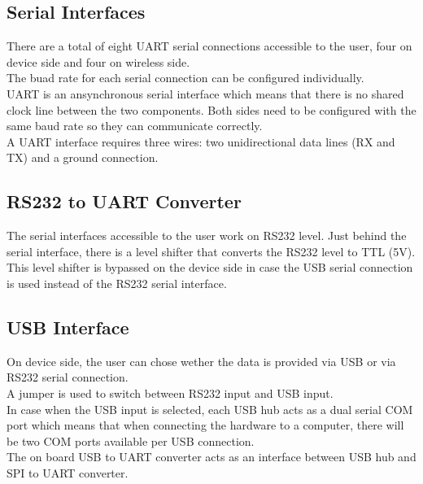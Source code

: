 \subsection{Serial Interfaces}
There are a total of eight UART serial connections accessible to the user, four on device side and four on wireless side.\\
The buad rate for each serial connection can be configured individually. \\
UART is an ansynchronous serial interface which means that there is no shared clock line between the two components. Both sides need to be configured with the same baud rate so they can communicate correctly.\\
A UART interface requires three wires: two unidirectional data lines (RX and TX) and a ground connection. \\
%
\subsection{RS232 to UART Converter}
The serial interfaces accessible to the user work on RS232 level. Just behind the serial interface, there is a level shifter that converts the RS232 level to TTL (5V). \\
This level shifter is bypassed on the device side in case the USB serial connection is used instead of the RS232 serial interface.
%
\subsection{USB Interface}
On device side, the user can chose wether the data is provided via USB or via RS232 serial connection.\\
A jumper is used to switch between RS232 input and USB input. \\
In case when the USB input is selected, each USB hub acts as a dual serial COM port which means that when connecting the hardware to a computer, there will be two COM ports available per USB connection. \\
The on board USB to UART converter acts as an interface between USB hub and SPI to UART converter.\\
%

